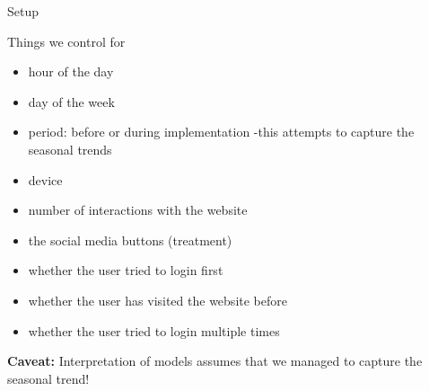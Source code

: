 \documentclass{beamer}
\begin{document}
			\begin{frame}{Setup}
			\begin{block}{Things we control for}
				\small
				\begin{itemize}
					\item hour of the day
					\item day of the week
					\item period: before or during implementation -this attempts to capture the seasonal trends
					\item device
					\item number of interactions with the website
					\item the social media buttons (treatment)
					\item whether the user tried to login first
					\item whether the user has visited the website before
					\item whether the user tried to login multiple times
				\end{itemize}
			\end{block}
			\tiny
			\textbf{Caveat:} Interpretation of models assumes that we managed to capture the seasonal trend!
			\end{frame}
			
\end{document}
